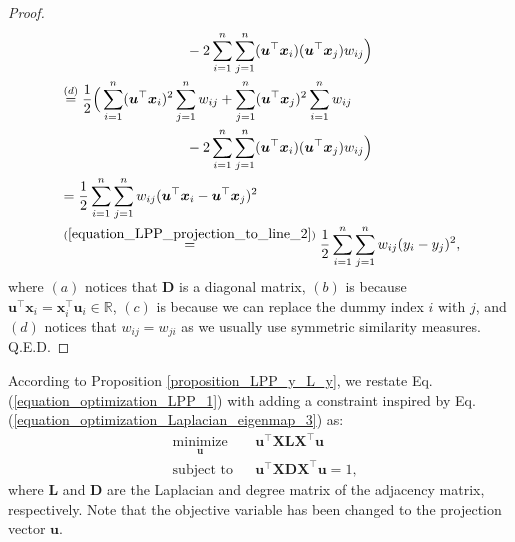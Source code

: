 \documentclass[lang=cn,10pt]{gorgeousnbook}
\numberwithin{equation}{section}%
\numberwithin{figure}{section}%
\begin{document}
\begin{proof}
\begin{align*}
&~~~~~~~~~~~~~~~~~~~~~~~~~~~ - 2\sum_{i=1}^n \sum_{j=1}^n (\boldsymbol{u}^\top \boldsymbol{x}_i) (\boldsymbol{u}^\top \boldsymbol{x}_j) w_{ij} \Big) \\
&\overset{(d)}{=} \frac{1}{2} \Big(\sum_{i=1}^n (\boldsymbol{u}^\top \boldsymbol{x}_i)^2 \sum_{j=1}^n w_{ij} + \sum_{j=1}^n (\boldsymbol{u}^\top \boldsymbol{x}_j)^2 \sum_{i=1}^n w_{ij} \\
&~~~~~~~~~~~~~~~~~~~~~~~~~~~ - 2\sum_{i=1}^n \sum_{j=1}^n (\boldsymbol{u}^\top \boldsymbol{x}_i) (\boldsymbol{u}^\top \boldsymbol{x}_j) w_{ij} \Big) \\
&= \frac{1}{2} \sum_{i=1}^n \sum_{j=1}^n w_{ij} (\boldsymbol{u}^\top \boldsymbol{x}_i - \boldsymbol{u}^\top \boldsymbol{x}_j)^2 \\
&\overset{(\ref{equation_LPP_projection_to_line_2})}{=} \frac{1}{2} \sum_{i=1}^n \sum_{j=1}^n w_{ij} (y_i - y_j)^2,
\end{align*}
where $(a)$ notices that $\boldsymbol{D}$ is a diagonal matrix, $(b)$ is because $\boldsymbol{u}^\top \boldsymbol{x}_i = \boldsymbol{x}_i^\top \boldsymbol{u}_i \in \mathbb{R}$, $(c)$ is because we can replace the dummy index $i$ with $j$, and $(d)$ notices that $w_{ij} = w_{ji}$ as we usually use symmetric similarity measures. Q.E.D.
\end{proof}

According to Proposition \ref{proposition_LPP_y_L_y}, we restate Eq. (\ref{equation_optimization_LPP_1}) with adding a constraint inspired by Eq. (\ref{equation_optimization_Laplacian_eigenmap_3}) as:
\begin{equation}\label{equation_optimization_LPP_2}
\begin{aligned}
& \underset{\boldsymbol{u}}{\text{minimize}}
& & \boldsymbol{u}^\top \boldsymbol{X} \boldsymbol{L} \boldsymbol{X}^\top \boldsymbol{u} \\
& \text{subject to}
& & 
\boldsymbol{u}^\top \boldsymbol{X} \boldsymbol{D} \boldsymbol{X}^\top \boldsymbol{u} = 1,
\end{aligned}
\end{equation}
where $\boldsymbol{L}$ and $\boldsymbol{D}$ are the Laplacian and degree matrix of the adjacency matrix, respectively. Note that the objective variable has been changed to the projection vector $\boldsymbol{u}$.
\end{document}
